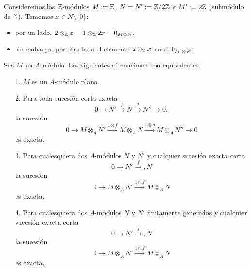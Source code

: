 \documentclass[../main.tex]{subfiles}
\begin{document}
\begin{example}
	Consideremos los $\mathbb{Z}$-módulos $M:=\mathbb{Z}$, $N=N':=\mathbb{Z}/2\mathbb{Z}$ y $M':=2\mathbb{Z}$ (submódulo de $\mathbb{Z}$). Tomemos $x\in N\setminus\{0\}$:
	\begin{itemize}
		\item por un lado, $2\otimes_{\mathbb{Z}} x=1\otimes_{\mathbb{Z}} 2x=0_{M\otimes N}$,
		\item sin embargo, por otro lado el elemento $2\otimes_{\mathbb{Z}} x$ no es $0_{M'\otimes N'}$.
	\end{itemize}
\end{example}

\begin{proposition}
	Sea $M$ un $A$-módulo. Las siguientes afirmaciones son equivalentes.
	\begin{itemize}
		\item[1.] $M$ es un $A$-módulo plano.
		\item[2.] Para toda sucesión corta exacta $$0\longrightarrow N'\overset{f}{\longrightarrow}N\overset{g}{\longrightarrow}N''\longrightarrow 0,$$
		la sucesión $$0\longrightarrow M\otimes_A N'\overset{1\otimes f}{\longrightarrow}M\otimes_A N\overset{1\otimes g}{\longrightarrow}M\otimes_A N''\longrightarrow 0$$ es exacta.
		\item[3.] Para cualesquiera dos $A$-módulos $N$ y $N'$ y cualquier sucesión exacta corta $$0\longrightarrow N'\overset{f}{\longrightarrow},N$$ la sucesión $$0\longrightarrow M\otimes_A N'\overset{1\otimes f}{\longrightarrow}M\otimes_A N$$ es exacta.
		\item[4.] Para cualesquiera dos $A$-módulos $N$ y $N'$ finitamente generados y cualquier sucesión exacta corta $$0\longrightarrow N'\overset{f}{\longrightarrow},N$$ la sucesión $$0\longrightarrow M\otimes_A N'\overset{1\otimes f}{\longrightarrow}M\otimes_A N$$ es exacta.
	\end{itemize}
\end{proposition}
\end{document}
